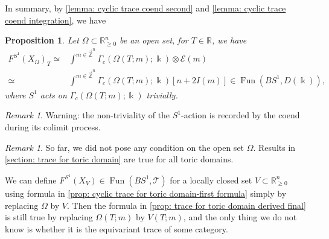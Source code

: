 \documentclass[11pt]{amsart}
\numberwithin{equation}{section}
\theoremstyle{plain}
\newtheorem{Prop}[prop]{Proposition}
\theoremstyle{definition}
\theoremstyle{remark}
\newtheorem{RMK}[rmk]{Remark}
\newcommand{\bR} { {\mathbb{R}}}
\newcommand{\cE} { {\mathcal{E}}}
\newcommand{\sT} { {\mathscr{T}}}
\newcommand\Fun{\operatorname{Fun}}
\newcommand{\rarbZ} { \overrightarrow{\mathbb{Z}}}
\begin{document}
In summary, by \autoref{lemma: cyclic trace coend second} and \autoref{lemma: cyclic trace coend integration}, we have
\begin{Prop}\label{prop: trace for toric domain derived final}Let $\Omega\subset \bR^n_{\geq 0}$ be an open set, for $T\in \bR$, we have
\begin{align*}
    F^{S^1}(X_\Omega)_{T}\simeq &\int^{m\in\rarbZ^n} \Gamma_c({ \Omega(T;m)} ;\Bbbk  )\otimes \cE(m)\\
    \simeq &\int^{m\in\rarbZ^n} \Gamma_c({ \Omega(T;m)} ;\Bbbk  )[n+2I(m)]\in \Fun(BS^1,D(\Bbbk)),
\end{align*}
where $S^1$ acts on $\Gamma_c({ \Omega(T;m)} ;\Bbbk  )$ trivially.
\end{Prop}
\begin{RMK}Warning: the non-triviality of the $S^1$-action is recorded by the coend during its colimit process.    
\end{RMK}


\begin{RMK}\label{remark: coend formula for general locally closed V}
    So far, we did not pose any condition on the open set $\Omega$. Results in \autoref{section: trace for toric domain} are true for all toric domains. 
    
    We can define $F^{S^1}(X_V) \in \Fun(BS^1,\sT)$ for a locally closed set $V\subset \bR^n_{\geq0}$ using formula in \autoref{prop: cyclic trace for toric domain-first formula} simply by replacing $\Omega$ by $V$. Then the formula in \autoref{prop: trace for toric domain derived final}  is still true by replacing $\Omega(T;m)$ by $V(T;m)$, and the only thing we do not know is whether it is the equivariant trace of some category.
\end{RMK}
\end{document}
